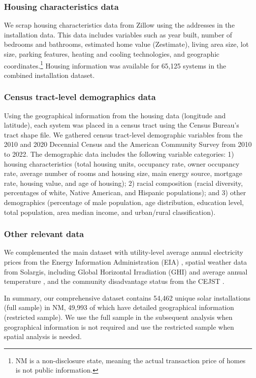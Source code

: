 \documentclass[11pt,twoside,letterpaper]{article}
\begin{document}
\subsubsection{Housing characteristics data}

We scrap housing characteristics data from Zillow using the addresses in the installation data. This data includes variables such as year built, number of bedrooms and bathrooms, estimated home value (Zestimate), living area size, lot size, parking features, heating and cooling technologies, and geographic coordinates.\footnote{NM is a non-disclosure state, meaning the actual transaction price of homes is not public information.} Housing information was available for 65,125 systems in the combined installation dataset.

\subsubsection{Census tract-level demographics data}

Using the geographical information from the housing data (longitude and latitude), each system was placed in a census tract using the Census Bureau’s tract shape file. We gathered census tract-level demographic variables from the 2010 and 2020 Decennial Census and the American Community Survey from 2010 to 2022. The demographic data includes the following variable categories: 1) housing characteristics (total housing units, occupancy rate, owner occupancy rate, average number of rooms and housing size, main energy source, mortgage rate, housing value, and age of housing); 2) racial composition (racial diversity, percentages of white, Native American, and Hispanic populations); and 3) other demographics (percentage of male population, age distribution, education level, total population, area median income, and urban/rural classification).

\subsubsection{Other relevant data}

We complemented the main dataset with utility-level average annual electricity prices from the Energy Information Administration (EIA) \parencite{eiaprice}, spatial weather data from Solargis, including Global Horizontal Irradiation (GHI) and average annual temperature \parencite{solargis}, and the community disadvantage status from the CEJST \parencite{cejst}.

In summary, our comprehensive dataset contains 54,462 unique solar installations (full sample) in NM, 49,993 of which have detailed geographical information (restricted sample). We use the full sample in the subsequent analysis when geographical information is not required and use the restricted sample when spatial analysis is needed.
\end{document}

